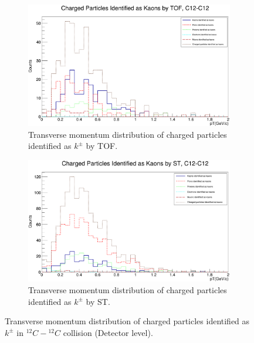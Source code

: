 \documentclass[12pt, twocolumn]{article}
\begin{document}
\clearpage

\begin{figure}[h]
\centering
\begin{subfigure}[h]{0.49\textwidth}
\centering
\includegraphics[scale=0.14]{Detector_pT_kaons(tof)_C12.png}
\caption{Transverse momentum distribution of charged particles identified as $k^{\pm}$ by TOF.}
\label{Detector - Transverse momentum distribution of kaons (TOF) C12.}
\end{subfigure}
\hfill
\begin{subfigure}[h]{0.49\textwidth}
\centering
\includegraphics[scale=0.14]{Detector_pT_kaons(st)_C12.png}
\caption{Transverse momentum distribution of charged particles identified as $k^{\pm}$ by ST.}
\label{Detector - Transverse momentum distribution of kaons (ST) C12.}
\end{subfigure}
\caption{Transverse momentum distribution of charged particles identified as $k^{\pm}$ in $^{12}C-{^{12}C}$ collision (Detector level).}
\label{Transverse momentum distribution of charged particles identified as kaons in C12-C12 collision.}
\end{figure}
\end{document}
